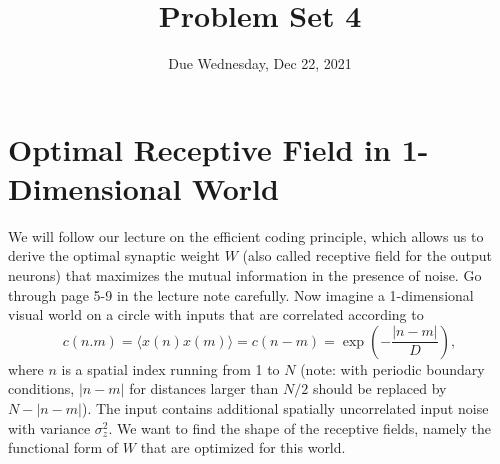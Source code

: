 \documentclass{article}
\title{Problem Set 4}
\date{Due Wednesday, Dec 22, 2021}
\begin{document}
\maketitle

\section*{Optimal Receptive Field in 1-Dimensional World}
We will follow our lecture on the efficient coding principle, which allows us to derive the optimal synaptic weight $W$ (also called receptive field for the output neurons) that maximizes the mutual information in the presence of noise. Go through page 5-9 in the lecture note carefully. Now imagine a 1-dimensional visual world on a circle with inputs that are correlated according to 
\begin{equation}
c(n.m) = \langle x(n)x(m)\rangle = c(n-m) = \exp(-\frac{|n-m|}{D}), 
\end{equation}
where $n$ is a spatial index running from 1 to $N$ (note: with periodic boundary conditions, $|n-m|$ for distances larger than $N/2$ should be replaced by $N-|n-m|$). The input contains additional spatially uncorrelated input noise with variance $\sigma_z^2$.  We want to find the shape of the receptive fields, namely the functional form of $W$ that are optimized for this world.
\end{document}
